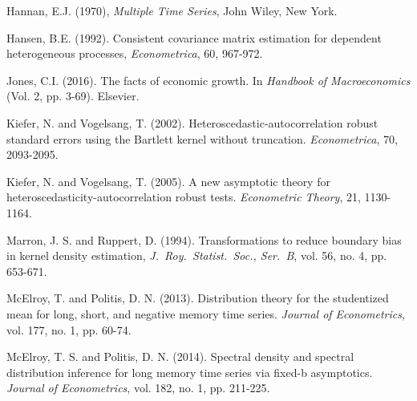 \documentclass[12p E.Lt,psfig]{article} %
\begin{document}
\begin{thebibliography}{999}


    Hannan, E.J. (1970),
   {\it Multiple Time Series}, John Wiley, New York.

\bibitem{} Hansen, B.E. (1992). Consistent covariance matrix estimation for dependent heterogeneous
processes, {\it Econometrica}, 60, 967-972.

 Jones, C.I.  (2016).
  The facts of economic growth. In  {\it Handbook of Macroeconomics} (Vol. 2, pp. 3-69). Elsevier.

\bibitem{} Kiefer,  N.  and  Vogelsang,  T.  (2002).
  Heteroscedastic-autocorrelation  robust  standard  errors
using the Bartlett kernel without truncation. {\it Econometrica}, 70, 2093-2095.

\bibitem{} Kiefer,   N.  and  Vogelsang,   T.  (2005).  A  new  asymptotic  theory  for
heteroscedasticity-autocorrelation robust tests. {\it Econometric Theory}, 21, 1130-1164.



\bibitem{} Marron, J. S. and  Ruppert, D. (1994). Transformations to reduce boundary bias in
 kernel density estimation, {\it J.~Roy.~Statist.~Soc., Ser.~B}, vol. 56, no. 4, pp. 653-671.

\bibitem{} McElroy, T. and  Politis, D. N. (2013). Distribution theory for the studentized mean for long, short,
 and negative memory time series.  {\it Journal of Econometrics}, vol. 177, no. 1, pp. 60-74.

\bibitem{} McElroy, T. S. and Politis, D. N. (2014). Spectral density and spectral distribution
  inference for long memory time series via fixed-b asymptotics. {\it Journal of Econometrics}, vol. 182, no. 1, pp. 211-225.



\end{thebibliography}
\end{document}
